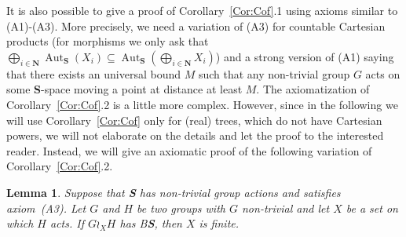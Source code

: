\documentclass[a4paper]{article}
\newtheorem{lem}{Lemma}[section]
\theoremstyle{definition}
\DeclareMathOperator\Aut{Aut}
\newcommand*{\field}[1]{\mathbf{#1}}
\newcommand*{\category}[1]{\textbf{#1}}
\newcommand*{\CatS}{\category{S}}
\newcommand*{\N}{\field{N}}
\newcommand*{\BS}{B\textbf{S}}
\newcommand*{\FW}{FW}
\newcommand*{\powerset}[1]{\mathcal P(#1)}
\begin{document}
It is also possible to give a proof of Corollary~\ref{Cor:Cof}.1 using axioms similar to (A1)-(A3).
More precisely, we need a variation of (A3) for countable Cartesian products (for morphisms we only ask that $\bigoplus_{i\in\N} \Aut_\CatS(X_i)\subseteq\Aut_\CatS(\bigoplus_{i\in\N} X_i)$) and a strong version of (A1) saying that there exists an universal bound $M$ such that any non-trivial group $G$ acts on some \CatS-space moving a point at distance at least $M$.
The axiomatization of Corollary~\ref{Cor:Cof}.2 is a little more complex.
However, since in the following we will use Corollary~\ref{Cor:Cof} only for (real) trees, which do not have Cartesian powers, we will not elaborate on the details and let the proof to the interested reader.
Instead, we will give an axiomatic proof of the following variation of Corollary~\ref{Cor:Cof}.2.
%
%
%
%
%
\begin{lem}\label{Lemma:XFinite}
Suppose that \CatS{} has non-trivial group actions and satisfies axiom~(A3).
Let $G$ and $H$ be two groups with $G$ non-trivial and let $X$ be a set on which $H$ acts.
If $G\wr_XH$ has \BS, then $X$ is finite.
\end{lem}
\end{document}
